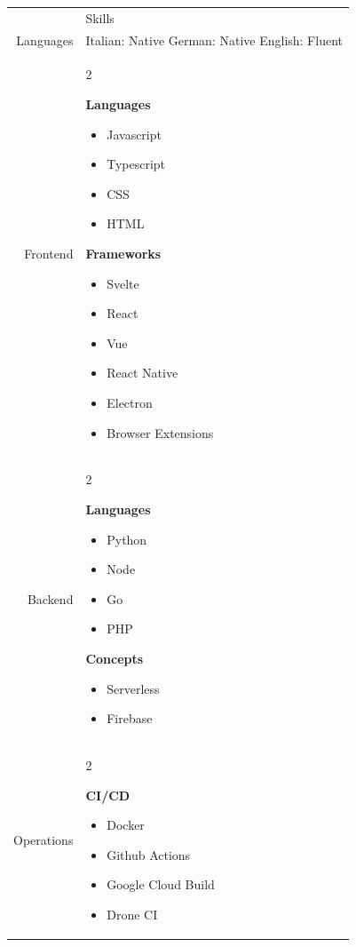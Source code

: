 \documentclass[letterpaper,12pt]{article}
\newcommand{\headingfont}{\Large\color{accent}\BluuNext}
\newenvironment{compactlist}{
  \begin{itemize}[noitemsep,nolistsep,partopsep=-20pt,topsep=-20pt,leftmargin=0pt, label=--]
      }{
  \end{itemize}
}
\newenvironment{lr}{
  \setlength\multicolsep{-1.7em}
  \begin{multicols}{2}
}{
  \end{multicols}
}
\newenvironment{SectionTable}[1]{
	\renewcommand*{\arraystretch}{1.7}
	\setlength{\tabcolsep}{10pt}
	\begin{longtable}{Rp{5.2in}} & #1 \\}
{\end{longtable}\vspace{-.3cm}}
\begin{document}
\begin{SectionTable}{\headingfont Skills}

  Languages &
  Italian: Native \newline
  German: Native \newline
  English: Fluent \newline
  \\

  Frontend &
  \begin{lr}
    \textbf{Languages}
    \begin{compactlist}
      \item Javascript
      \item Typescript
      \item CSS
      \item HTML
    \end{compactlist}

    \columnbreak

    \textbf{Frameworks}
    \begin{compactlist}
      \item Svelte
      \item React
      \item Vue
      \item React Native
      \item Electron
      \item Browser Extensions
    \end{compactlist}
  \end{lr}
  \\

  Backend &
  \begin{lr}
    \textbf{Languages}
    \begin{compactlist}
      \item Python
      \item Node
      \item Go
      \item PHP
    \end{compactlist}
    \columnbreak
    \textbf{Concepts}
    \begin{compactlist}
      \item Serverless
      \item Firebase
    \end{compactlist}
  \end{lr}
  \\

  Operations &
  \begin{lr}
    \textbf{CI/CD}
    \begin{compactlist}
      \item Docker
      \item Github Actions
      \item Google Cloud Build
      \item Drone CI
    \end{compactlist}


\end{lr}
\end{SectionTable}
\end{document}
